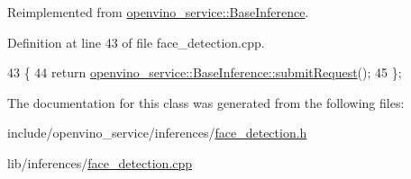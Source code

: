 Reimplemented from \hyperlink{classopenvino__service_1_1BaseInference_a33b93ef057b95bf7968583e4c2eba0c9}{openvino\+\_\+service\+::\+Base\+Inference}.



Definition at line 43 of file face\+\_\+detection.\+cpp.


\begin{DoxyCode}
43                                                   \{
44   \textcolor{keywordflow}{return} \hyperlink{classopenvino__service_1_1BaseInference_a33b93ef057b95bf7968583e4c2eba0c9}{openvino\_service::BaseInference::submitRequest}();
45 \};
\end{DoxyCode}


The documentation for this class was generated from the following files\+:\begin{DoxyCompactItemize}
\item 
include/openvino\+\_\+service/inferences/\hyperlink{face__detection_8h}{face\+\_\+detection.\+h}\item 
lib/inferences/\hyperlink{face__detection_8cpp}{face\+\_\+detection.\+cpp}\end{DoxyCompactItemize}

